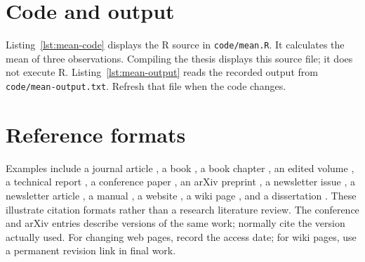 \section{Code and output}
Listing~\ref{lst:mean-code} displays the R source in \texttt{code/mean.R}.
It calculates the mean of three observations. Compiling the thesis displays
this source file; it does not execute R. Listing~\ref{lst:mean-output} reads
the recorded output from \texttt{code/mean-output.txt}. Refresh that file
when the code changes.




\section{Reference formats}
Examples include a journal article \citep{adler1965topological}, a book
\citep{lamport1994latex}, a book chapter \citep{cullum1986practical}, an edited
volume
\citep{cullum1986large}, a technical report \citep{amann1974lectures}, a
conference
paper \citep{vaswani2017attentiona}, an arXiv preprint
\citep{vaswani2017attentionb}, a newsletter issue \citep{rnews2001news}, a
newsletter
article \citep{hornik2001editorial}, a manual \citep{venables2026introduction},
a website
\citep{rfoundationndproject}, a wiki page \citep{wikipediandbibtex}, and a
dissertation \citep{mcgough1993solution}. These illustrate citation formats
rather
than a research literature review. The conference and arXiv entries describe
versions of the same work; normally cite the version actually used. For
changing web pages, record the access date; for wiki pages, use a permanent
revision link in final work.
